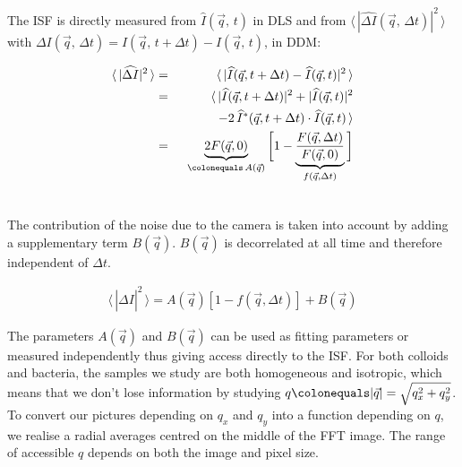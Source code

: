 \documentclass[%
 aip,
 jmp,%
 amsmath,amssymb,
reprint,%
]{revtex4-1}
\begin{document}
The ISF  is directly measured from $\hat{I}(\vec{q}, \, t)$ in DLS and from $\langle \, | \widehat{\Delta I}(\vec{q},\,\Delta t)|^2 \, \rangle$ with $\Delta I(\vec{q},\,\Delta t) = I(\vec{q},\, t+\Delta t) - I(\vec{q},\, t)$, in DDM:

\begin{eqnarray}
\langle \, |\widehat{\Delta I}|^2 \, \rangle &=& \langle \, |\widehat{I}(\vec{q},t+\Delta t) - \widehat{I}(\vec{q},t)|^2 \, \rangle \\ \nonumber
&=& \langle \, |\widehat{I}(\vec{q},t+ \Delta t)|^2 + |\widehat{I}(\vec{q},t)|^2 \\ \nonumber
&& \qquad \quad - 2 \, \widehat{I}^*(\vec{q},t+\Delta t) \cdot \widehat{I}(\vec{q},t) \, \rangle\\\nonumber
&=& \underbrace{2F(\vec{q}, 0)}_{\colonequals \, A(\vec{q})} \bigg[ 1-\underbrace{\frac{F(\vec{q}, \Delta t)}{F(\vec{q}, 0)}}_{f(\vec{q}, \Delta t)} \bigg]\\\nonumber
\end{eqnarray}

The contribution of the noise due to the camera is taken into account by adding a supplementary term $B(\vec{q})$. $B(\vec{q})$ is decorrelated  at all time and therefore independent of $\Delta t$.

\begin{eqnarray}
\langle \, |\widehat{\Delta I}|^2 \, \rangle = A(\vec{q})[1-f(\vec{q}, \Delta t)] + B(\vec{q})
\end{eqnarray}

The parameters $A(\vec{q})$ and $B(\vec{q})$ can be used as fitting parameters or measured independently thus giving access directly to the ISF. For both colloids and bacteria, the samples we study are both homogeneous and isotropic, which means that we don't lose information by studying $q \colonequals |\vec{q}| = \sqrt{q_x^2 + q_y ^2}$. To convert our pictures depending on $q_x$ and $q_y$ into a function depending on $q$, we realise a radial averages centred on the middle of the FFT image. The range of accessible $q$ depends on both the image and pixel size.
\end{document}
